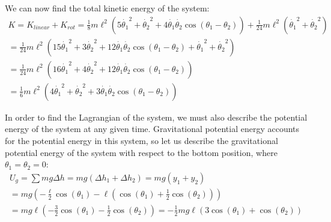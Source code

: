 \documentclass[]{article}
\begin{document}
We can now find the total kinetic energy of the system:
\begin{gather*}
	K = K_{linear} + K_{rot} = \frac{1}{8}m\ell^2(5\dot{\theta_1}^2 + \dot{\theta_2}^2 + 4\dot{\theta_1}\dot{\theta_2}\cos(\theta_1 - \theta_2)) + \frac{1}{24}m\ell^2(\dot{\theta_1}^2 + \dot{\theta_2}^2) \\
	= \frac{1}{24}m\ell^2(15\dot{\theta_1}^2 + 3\dot{\theta_2}^2 + 12\dot{\theta_1}\dot{\theta_2}\cos(\theta_1 - \theta_2) + \dot{\theta_1}^2 + \dot{\theta_2}^2) \\
	= \frac{1}{24}m\ell^2(16\dot{\theta_1}^2 + 4\dot{\theta_2}^2 + 12\dot{\theta_1}\dot{\theta_2}\cos(\theta_1 - \theta_2) ) \\
	= \frac16m\ell^2(4\dot{\theta_1}^2 + \dot{\theta_2}^2 + 3\dot{\theta_1}\dot{\theta_2}\cos(\theta_1 - \theta_2))
\end{gather*}

In order to find the Lagrangian of the system, we must also describe the potential energy of the system at any given time. Gravitational potential energy accounts for the potential energy in this system, so let us describe the gravitational potential energy of the system with respect to the bottom position, where $\theta_1 = \theta_2 = 0$:
\begin{gather*}
	U_g = \sum mg\Delta h = mg(\Delta h_1 + \Delta h_2) = mg(y_1 + y_2) \\
	= mg(-\frac{\ell}{2}\cos(\theta_1)- \ell (\cos(\theta_1) + \frac{1}{2} \cos(\theta_2))) \\
	= mg\ell(-\frac32\cos(\theta_1) - \frac12\cos(\theta_2)) = -\frac12 mg\ell(3\cos(\theta_1) + \cos(\theta_2))
\end{gather*}
\end{document}
